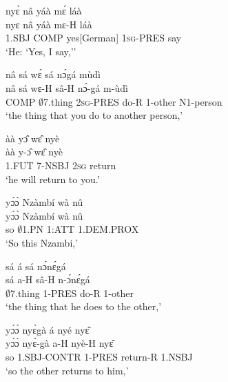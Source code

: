\begin{exe} 
\exN\label{239}
  \glll nyɛ̀ nâ yáà mɛ́ láà \\
      nyɛ nâ yáà mɛ-H láà \\
        1.SBJ COMP yes[German] 1\textsc{sg}-PRES say  \\
    \trans `He: `Yes, I say,''
\end{exe}

\begin{exe} 
\exN\label{240}
  \glll nâ sá wɛ́ sá nɔ́gá mùdì \\
        nâ sá wɛ-H sâ-H nɔ́-gá m-ùdì \\
        COMP $\emptyset$7.thing 2\textsc{sg}-PRES do-R 1-other N1-person  \\
    \trans `the thing that you do to another person,'
\end{exe}

\begin{exe} 
\exN\label{241}
  \glll àà yɔ̂ wɛ̂ nyè \\
         àà y-ɔ̂ wɛ̂ nyè \\
         1.FUT 7-NSBJ 2\textsc{sg} return \\
    \trans `he will return to you.'
\end{exe}

\begin{exe} 
\exN\label{242}
  \glll yɔ́ɔ̀ Nzàmbí wà nû \\
         yɔ́ɔ̀ Nzàmbí wà nû \\
         so $\emptyset$1.PN 1:ATT 1.DEM.PROX \\
    \trans `So this Nzambi,'
\end{exe}

\begin{exe} 
\exN\label{243}
  \glll sá á sá nɔ́nɛ́gá \\
      sá a-H sâ-H n-ɔ́nɛ́gá \\
        $\emptyset$7.thing 1-PRES do-R 1-other  \\
    \trans `the thing that he does to the other,'
\end{exe}

\begin{exe} 
\exN\label{244} 
  \glll yɔ́ɔ̀ nyɛ̀gà á nyé nyɛ̂ \\
        yɔ́ɔ̀ nyɛ̀-gà a-H nyè-H nyɛ̂ \\
         so 1.SBJ-CONTR 1-PRES return-R 1.NSBJ \\
    \trans `so the other returns to him,'
\end{exe}

